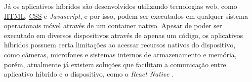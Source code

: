 Já os aplicativos híbridos são desenvolvidos utilizando tecnologias web, como \label{sig:HTML}\hyperlink{s:HTML}{HTML}, \label{sig:CSS}\hyperlink{s:CSS}{CSS} e \textit{Javascript}, e por isso, podem ser executados em qualquer sistema operacionais móvel através de um container nativo. Apesar de poder ser executado em diversos dispositivos através de apenas um código, os aplicativos híbridos	 possuem certa limitações ao acessar recursos nativos do dispositivo, como câmeras, microfones e sistemas internos de armazenamento e memória, porém, atualmente já existem soluções que facilitam a comunicação entre aplicativo híbrido e o dispositivo, como o \textit{React Native} \cite{MobileApps}.




